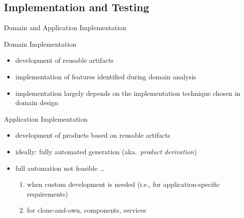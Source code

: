 \subsection{Implementation and Testing}
\begin{frame}{Domain and Application Implementation}
	\begin{mycolumns}[T,columns=3,widths={10}]
		\renewcommand{\projectcartoonwidth}{1}
	\mynextcolumn
		\begin{definition}{Domain Implementation} %
			\begin{itemize}
				\item development of reusable artifacts
				\item implementation of features identified during domain analysis
				\item implementation largely depends on the implementation technique chosen in domain design
			\end{itemize}
		\end{definition}
	\mynextcolumn
		\begin{definition}{Application Implementation}
			\begin{itemize}
				\item development of products based on reusable artifacts
				\item ideally: fully automated generation (aka.\ \emph{product derivation})
				\item full automation not feasible \ldots
					\begin{enumerate}
						\item when custom development is needed (i.e., for application-specific requirements)
						\item for clone-and-own, components, services
					\end{enumerate}
			\end{itemize}
		\end{definition}
	\end{mycolumns}
\end{frame}

